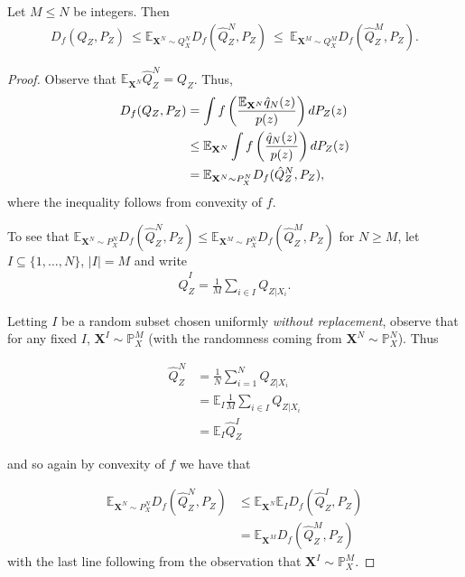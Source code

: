 \setcounter{proposition}{0}
\begin{proposition}
Let $M \leq N$ be integers. Then
\begin{align*}
    D_f(Q_Z , P_Z) \ \leq 
    \mathbb{E}_{\mathbf{X}^N \sim Q_{X}^N} D_f( \hat{Q}_Z^N , P_Z) \  \leq \ \mathbb{E}_{\mathbf{X}^M \sim Q_{X}^M} D_f( \hat{Q}_Z^M , P_Z).
\end{align*}
\end{proposition}
\begin{proof}
Observe that $\mathbb{E}_{\mathbf{X}^N} \hat{Q}_Z^N = Q_Z$. Thus,
\begin{align*}
    D_f(Q_Z , P_Z) &= \int f\left(\frac{\mathbb{E}_{\mathbf{X}^N}\hat{q}_N(z)}{p(z)}\right) dP_Z(z) \\
    &\leq \mathbb{E}_{\mathbf{X}^N} \int f\left(\frac{\hat{q}_N(z)}{p(z)}\right) dP_Z(z)\\
    &=\mathbb{E}_{\mathbf{X}^N \sim P_{X}^N} D_f( \hat{Q}_Z^N , P_Z),
\end{align*}
where the inequality follows from convexity of $f$.

To see that $\mathbb{E}_{\mathbf{X}^N \sim P_{X}^N} D_f( \hat{Q}_Z^N , P_Z) \leq \mathbb{E}_{\mathbf{X}^M \sim P_{X}^N} D_f( \hat{Q}_Z^M , P_Z)$ for $N \geq M$,
let $I \subseteq \{1, \ldots, N\}$, $|I| = M$ and write
\begin{align*}
    \hat{Q}_Z^I = \frac{1}{M} \sum_{i \in I} Q_{Z | X_i}.
\end{align*}

Letting $I$ be a random subset chosen uniformly \emph{without replacement},
observe that for any fixed $I$, $\mathbf{X}^I \sim \mathbb{P}_X^M$ (with the randomness coming from $\mathbf{X}^N \sim \mathbb{P}_X^N$). Thus

\begin{align*}
    \hat{Q}_Z^N &= \frac{1}{N} \sum_{i=1}^N Q_{Z|X_i} \\
    &= \mathbb{E}_I \frac{1}{M} \sum_{i \in I} Q_{Z|X_i} \\
    &= \mathbb{E}_I \hat{Q}_Z^I
\end{align*}

and so again by convexity of $f$ we have that

\begin{align}
    \mathbb{E}_{\mathbf{X}^N \sim P_{X}^N} D_f( \hat{Q}_Z^N , P_Z) &\leq  \mathbb{E}_{\mathbf{X}^N} \mathbb{E}_I D_f( \hat{Q}_Z^I , P_Z) \\
    &= \mathbb{E}_{\mathbf{X}^M} D_f(\hat{Q}_Z^M , P_Z)
\end{align}
with the last line following from the observation that $\mathbf{X}^I \sim \mathbb{P}_X^M$.
\end{proof}



